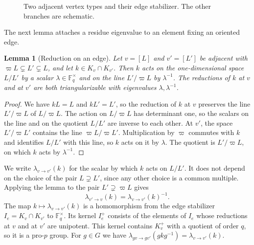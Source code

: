 \documentclass[12pt,letterpaper]{article}
\numberwithin{equation}{section}
\newtheorem{lemma}[theorem]{Lemma}
\theoremstyle{definition}
\theoremstyle{remark}
\newcommand{\kk}{\mathbb F_q}
\begin{document}
\begin{figure}[ht]
\centering
{}
\caption{Two adjacent vertex types and their edge stabilizer. The other branches are schematic.}
\label{fig:edge}
\end{figure}

The next lemma attaches a residue eigenvalue to an element fixing an oriented edge.

\begin{lemma}[Reduction on an edge]\label{lem:edgered}
Let $v=[L]$ and $v'=[L']$ be adjacent with $\varpi L\subsetneq L'\subsetneq L$, and let $k\in K_v\cap K_{v'}$. Then $k$ acts on the one-dimensional space $L/L'$ by a scalar $\lambda\in\kk^\times$ and on the line $L'/\varpi L$ by $\lambda^{-1}$. The reductions of $k$ at $v$ and at $v'$ are both triangularizable with eigenvalues $\lambda,\lambda^{-1}$.
\end{lemma}
\begin{proof}
We have $kL=L$ and $kL'=L'$, so the reduction of $k$ at $v$ preserves the line $L'/\varpi L$ of $L/\varpi L$. The action on $L/\varpi L$ has determinant one, so the scalars on the line and on the quotient $L/L'$ are inverse to each other. At $v'$, the space $L'/\varpi L'$ contains the line $\varpi L/\varpi L'$. Multiplication by $\varpi$ commutes with $k$ and identifies $L/L'$ with this line, so $k$ acts on it by $\lambda$. The quotient is $L'/\varpi L$, on which $k$ acts by $\lambda^{-1}$.
\end{proof}

We write $\lambda_{v\to v'}(k)$ for the scalar by which $k$ acts on $L/L'$. It does not depend on the choice of the pair $L\supsetneq L'$, since any other choice is a common multiple. Applying the lemma to the pair $L'\supsetneq\varpi L$ gives
\begin{equation}\label{eq:lambda-inv}
 \lambda_{v'\to v}(k)=\lambda_{v\to v'}(k)^{-1}.
\end{equation}
The map $k\mapsto\lambda_{v\to v'}(k)$ is a homomorphism from the edge stabilizer $I_e=K_v\cap K_{v'}$ to $\kk^\times$. Its kernel $I_e^+$ consists of the elements of $I_e$ whose reductions at $v$ and at $v'$ are unipotent. This kernel contains $K_v^+$ with a quotient of order $q$, so it is a pro-$p$ group. For $g\in G$ we have $\lambda_{gv\to gv'}(gkg^{-1})=\lambda_{v\to v'}(k)$.
\end{document}
